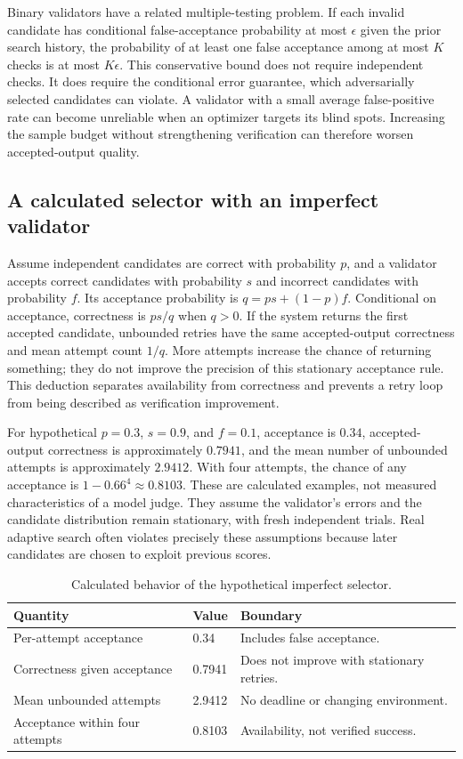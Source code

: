 Binary validators have a related multiple-testing problem. If each invalid candidate has conditional false-acceptance probability at most $\epsilon$ given the prior search history, the probability of at least one false acceptance among at most $K$ checks is at most $K\epsilon$. This conservative bound does not require independent checks. It does require the conditional error guarantee, which adversarially selected candidates can violate. A validator with a small average false-positive rate can become unreliable when an optimizer targets its blind spots. Increasing the sample budget without strengthening verification can therefore worsen accepted-output quality.

\subsection{A calculated selector with an imperfect validator}
Assume independent candidates are correct with probability $p$, and a validator accepts correct candidates with probability $s$ and incorrect candidates with probability $f$. Its acceptance probability is $q=ps+(1-p)f$. Conditional on acceptance, correctness is $ps/q$ when $q>0$. If the system returns the first accepted candidate, unbounded retries have the same accepted-output correctness and mean attempt count $1/q$. More attempts increase the chance of returning something; they do not improve the precision of this stationary acceptance rule. This deduction separates availability from correctness and prevents a retry loop from being described as verification improvement.

For hypothetical $p=0.3$, $s=0.9$, and $f=0.1$, acceptance is $0.34$, accepted-output correctness is approximately $0.7941$, and the mean number of unbounded attempts is approximately $2.9412$. With four attempts, the chance of any acceptance is $1-0.66^4\approx0.8103$. These are calculated examples, not measured characteristics of a model judge. They assume the validator's errors and the candidate distribution remain stationary, with fresh independent trials. Real adaptive search often violates precisely these assumptions because later candidates are chosen to exploit previous scores.

{\small\setlength{\tabcolsep}{3pt}
\begin{table}[!htbp]
\centering
\caption{Calculated behavior of the hypothetical imperfect selector.}\label{tab:C09:selector}
\begin{tabular}{L{37mm}L{30mm}L{39mm}}

\toprule Quantity & Value & Boundary\\\midrule
Per-attempt acceptance & 0.34 & Includes false acceptance.\\
Correctness given acceptance & 0.7941 & Does not improve with stationary retries.\\
Mean unbounded attempts & 2.9412 & No deadline or changing environment.\\
Acceptance within four attempts & 0.8103 & Availability, not verified success.\\
\bottomrule
\end{tabular}
\end{table}
}

